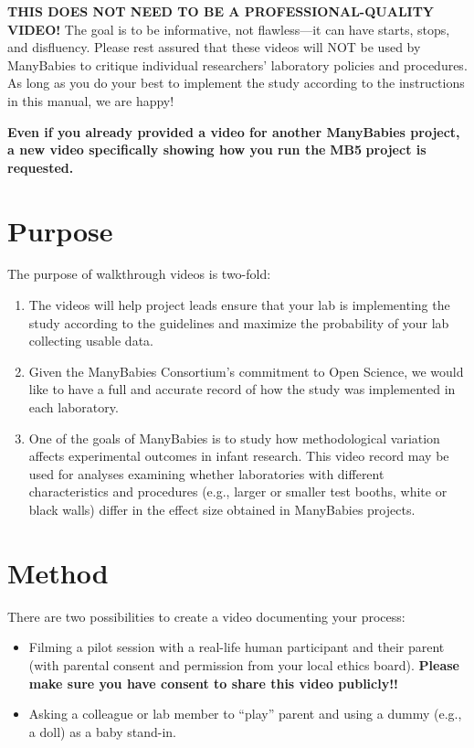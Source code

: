\documentclass[
  letterpaper,
  DIV=11,
  numbers=noendperiod,
  oneside]{scrreprt}
\providecommand{\tightlist}{%
  \setlength{\itemsep}{0pt}\setlength{\parskip}{0pt}}
\begin{document}
\textbf{THIS DOES NOT NEED TO BE A PROFESSIONAL-QUALITY VIDEO!} The goal
is to be informative, not flawless---it can have starts, stops, and
disfluency. Please rest assured that these videos will NOT be used by
ManyBabies to critique individual researchers' laboratory policies and
procedures. As long as you do your best to implement the study according
to the instructions in this manual, we are happy!

\textbf{Even if you already provided a video for another ManyBabies
project, a new video specifically showing how you run the} \textbf{MB5}
\textbf{project is requested.}

\section{Purpose}\label{purpose}

The purpose of walkthrough videos is two-fold:

\begin{enumerate}
\def\labelenumi{\arabic{enumi}.}
\tightlist
\item
  The videos will help project leads ensure that your lab is
  implementing the study according to the guidelines and maximize the
  probability of your lab collecting usable data.
\item
  Given the ManyBabies Consortium's commitment to Open Science, we would
  like to have a full and accurate record of how the study was
  implemented in each laboratory.
\item
  One of the goals of ManyBabies is to study how methodological
  variation affects experimental outcomes in infant research. This video
  record may be used for analyses examining whether laboratories with
  different characteristics and procedures (e.g., larger or smaller test
  booths, white or black walls) differ in the effect size obtained in
  ManyBabies projects.
\end{enumerate}

\section{Method}\label{method}

There are two possibilities to create a video documenting your process:

\begin{itemize}
\tightlist
\item
  Filming a pilot session with a real-life human participant and their parent (with parental consent and
  permission from your local ethics board). \textbf{Please make sure you
  have consent to share this video publicly!!}
\item
  Asking a colleague or lab member to ``play'' parent and using a dummy
  (e.g., a doll) as a baby stand-in.
\end{itemize}
\end{document}
